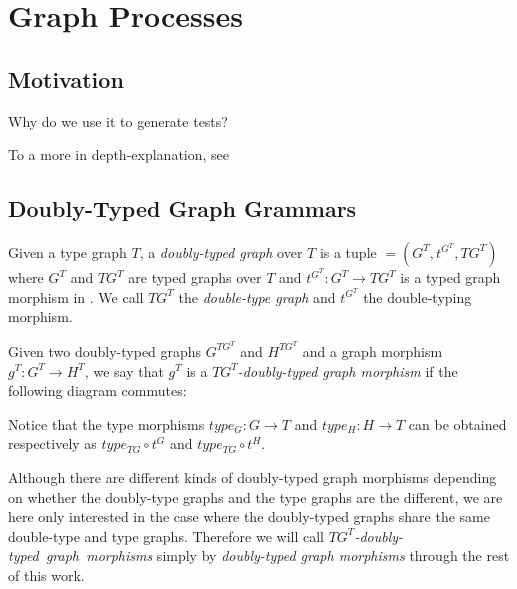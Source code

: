 \chapter{Graph Processes}

\section{Motivation}

Why do we use it to generate tests?

To a more in depth-explanation, see~\cite{Ribeiro1996, Corradini2014} 

\section{Doubly-Typed Graph Grammars}

\begin{definition} Given a type graph $T$, a \emph{doubly-typed graph} \doublyTypedGraph{} over $T$ is a tuple \doublyTypedGraph $= \left(G^T, t^{G^T},TG^T\right)$ where $G^T$ and $TG^T$ are typed graphs over $T$ and \mbox{$t^{G^T} : G^T \rightarrow TG^T$} is a typed graph morphism in \typedGraphCategory{}. We call $TG^T$ the \emph{double-type graph} and $t^{G^T}$ the double-typing morphism.

\end{definition}

\begin{definition}
  Given two doubly-typed graphs $G^{TG^T}$ and $H^{TG^T}$ and a graph morphism $g^T : G^T \rightarrow H^T$, we say that $g^T$ is a \emph{$TG^T$-doubly-typed graph morphism} if the following diagram commutes:

\end{definition}

Notice that the type morphisms $type_G : G \rightarrow T$ and $type_H : H \rightarrow T$ can be obtained respectively as $type_{TG} \circ t^G$ and $type_{TG} \circ t^H$.

\begin{remark} Although there are different kinds of doubly-typed graph morphisms depending on whether the doubly-type graphs and the type graphs are the different, we are here only interested in the case where the doubly-typed graphs share the same double-type and type graphs. Therefore we will call \mbox{\emph{$TG^T$-doubly-typed graph morphisms}} simply by \emph{doubly-typed graph morphisms} through the rest of this work.

\end{remark}

